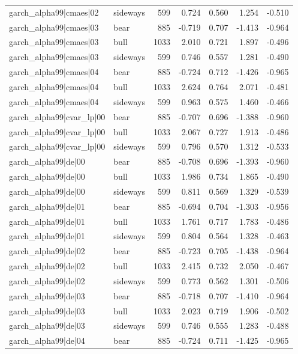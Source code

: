 \begin{table}
\begin{tabular}{llrrrrr}
garch\_alpha99|cmaes|02 & sideways & 599 & 0.724 & 0.560 & 1.254 & -0.510 \\
garch\_alpha99|cmaes|03 & bear & 885 & -0.719 & 0.707 & -1.413 & -0.964 \\
garch\_alpha99|cmaes|03 & bull & 1033 & 2.010 & 0.721 & 1.897 & -0.496 \\
garch\_alpha99|cmaes|03 & sideways & 599 & 0.746 & 0.557 & 1.281 & -0.490 \\
garch\_alpha99|cmaes|04 & bear & 885 & -0.724 & 0.712 & -1.426 & -0.965 \\
garch\_alpha99|cmaes|04 & bull & 1033 & 2.624 & 0.764 & 2.071 & -0.481 \\
garch\_alpha99|cmaes|04 & sideways & 599 & 0.963 & 0.575 & 1.460 & -0.466 \\
garch\_alpha99|cvar\_lp|00 & bear & 885 & -0.707 & 0.696 & -1.388 & -0.960 \\
garch\_alpha99|cvar\_lp|00 & bull & 1033 & 2.067 & 0.727 & 1.913 & -0.486 \\
garch\_alpha99|cvar\_lp|00 & sideways & 599 & 0.796 & 0.570 & 1.312 & -0.533 \\
garch\_alpha99|de|00 & bear & 885 & -0.708 & 0.696 & -1.393 & -0.960 \\
garch\_alpha99|de|00 & bull & 1033 & 1.986 & 0.734 & 1.865 & -0.490 \\
garch\_alpha99|de|00 & sideways & 599 & 0.811 & 0.569 & 1.329 & -0.539 \\
garch\_alpha99|de|01 & bear & 885 & -0.694 & 0.704 & -1.303 & -0.956 \\
garch\_alpha99|de|01 & bull & 1033 & 1.761 & 0.717 & 1.783 & -0.486 \\
garch\_alpha99|de|01 & sideways & 599 & 0.804 & 0.564 & 1.328 & -0.463 \\
garch\_alpha99|de|02 & bear & 885 & -0.723 & 0.705 & -1.438 & -0.964 \\
garch\_alpha99|de|02 & bull & 1033 & 2.415 & 0.732 & 2.050 & -0.467 \\
garch\_alpha99|de|02 & sideways & 599 & 0.773 & 0.562 & 1.301 & -0.506 \\
garch\_alpha99|de|03 & bear & 885 & -0.718 & 0.707 & -1.410 & -0.964 \\
garch\_alpha99|de|03 & bull & 1033 & 2.023 & 0.719 & 1.906 & -0.502 \\
garch\_alpha99|de|03 & sideways & 599 & 0.746 & 0.555 & 1.283 & -0.488 \\
garch\_alpha99|de|04 & bear & 885 & -0.724 & 0.711 & -1.425 & -0.965 \\

\end{tabular}
\end{table}
